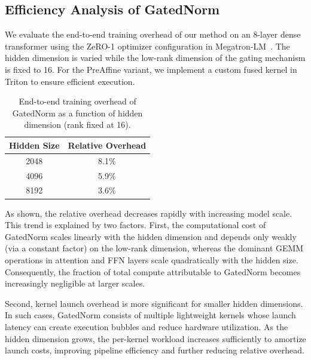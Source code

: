 \documentclass{article} %
\begin{document}

\subsection{Efficiency Analysis of GatedNorm}
\label{app:efficiency}

We evaluate the end-to-end training overhead of our method on an 8-layer dense transformer using the ZeRO-1 optimizer configuration in Megatron-LM~\citep{shoeybi2019megatron}. The hidden dimension is varied while the low-rank dimension of the gating mechanism is fixed to 16. For the PreAffine variant, we implement a custom fused kernel in Triton to ensure efficient execution.


\begin{table}[h]
\centering
\caption{End-to-end training overhead of GatedNorm as a function of hidden dimension (rank fixed at 16).}
\label{tab:overhead}
\begin{tabular}{cc}
\toprule
Hidden Size & Relative Overhead \\
\midrule
2048 & 8.1\% \\
4096 & 5.9\% \\
8192 & 3.6\% \\
\bottomrule
\end{tabular}
\end{table}

As shown, the relative overhead decreases rapidly with increasing model scale. This trend is explained by two factors. 
First, the computational cost of GatedNorm scales linearly with the hidden dimension and depends only weakly (via a constant factor) on the low-rank dimension, whereas the dominant GEMM operations in attention and FFN layers scale quadratically with the hidden size.
Consequently, the fraction of total compute attributable to GatedNorm becomes increasingly negligible at larger scales.

Second, kernel launch overhead is more significant for smaller hidden dimensions. In such cases, GatedNorm consists of multiple lightweight kernels whose launch latency can create execution bubbles and reduce hardware utilization. 
As the hidden dimension grows, the per-kernel workload increases sufficiently to amortize launch costs, improving pipeline efficiency and further reducing relative overhead.
\end{document}
